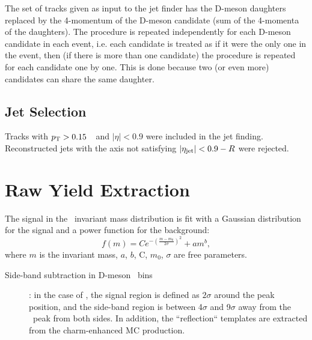 The set of tracks given as input to the jet finder has the D-meson daughters replaced 
by the 4-momentum of the D-meson candidate (sum of the 4-momenta of the daughters).
The procedure is repeated independently for each D-meson candidate in each event, 
i.e. each candidate is treated as if it were the only one in the event, then (if there is more than one candidate) the procedure
is repeated for each candidate one by one.
This is done because two (or even more) candidates can share the same daughter. 

\subsection{Jet Selection}

Tracks with $p_{\rm T}>0.15$~\GeVc\ and $|\eta|<0.9$ were included in the jet finding. 
Reconstructed jets with the axis not satisfying $|\eta_{\mathrm{jet}}|<0.9-R$ were rejected.


\section{Raw Yield Extraction}
\label{sect:raw_yield}

The signal in the \Dzero\ invariant mass distribution is fit with a Gaussian distribution for the signal and a power function for the background:
\begin{equation}
\label{e_sigbkgDZero}
f (m) = Ce^{-(\frac{m-m_0}{2\sigma})^2} + am^b,
\end{equation}
where $m$ is the invariant mass, $a$, $b$, C, $m_0$, $\sigma$ are free parameters.

\begin{description}
\item[Side-band subtraction in D-meson \pt\ bins]: in the case of \Dzero, the signal region is defined as $2\sigma$ around the peak position, and the side-band region is between 4$\sigma$ and 9$\sigma$ away from the \Dzero\ peak from both sides.
In addition, the ``reflection`` templates are extracted from the charm-enhanced MC production. %
\end{description}


